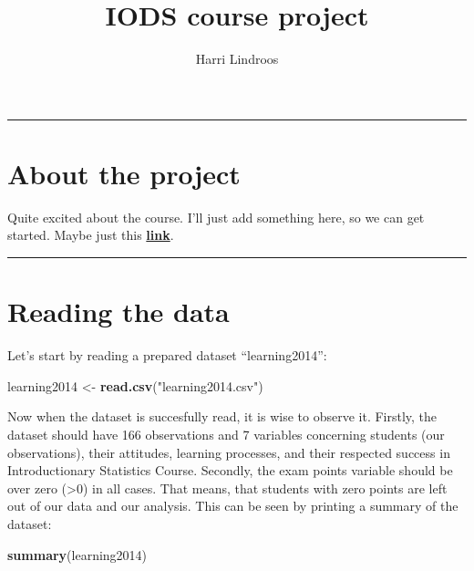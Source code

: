 \documentclass[]{article}
\title{IODS course project}
\author{Harri Lindroos}
\date{}
\newenvironment{Shaded}{\begin{snugshade}}{\end{snugshade}}
\newcommand{\KeywordTok}[1]{\textcolor[rgb]{0.13,0.29,0.53}{\textbf{#1}}}
\newcommand{\StringTok}[1]{\textcolor[rgb]{0.31,0.60,0.02}{#1}}
\newcommand{\NormalTok}[1]{#1}
\begin{document}
\maketitle

{
\setcounter{tocdepth}{2}
\tableofcontents
}
\begin{center}\rule{0.5\linewidth}{\linethickness}\end{center}

\section{About the project}\label{about-the-project}

Quite excited about the course. I'll just add something here, so we can
get started. Maybe just this
\href{https://github.com/harrlind/IODS-project}{\textbf{link}}.

\begin{center}\rule{0.5\linewidth}{\linethickness}\end{center}

\section{Reading the data}\label{reading-the-data}

Let's start by reading a prepared dataset ``learning2014'':

\begin{Shaded}
\begin{Highlighting}[]
\NormalTok{learning2014 <-}\StringTok{ }\KeywordTok{read.csv}\NormalTok{(}\StringTok{"learning2014.csv"}\NormalTok{)}
\end{Highlighting}
\end{Shaded}

Now when the dataset is succesfully read, it is wise to observe it.
Firstly, the dataset should have 166 observations and 7 variables
concerning students (our observations), their attitudes, learning
processes, and their respected success in Introductionary Statistics
Course. Secondly, the exam points variable should be over zero
(\textgreater{}0) in all cases. That means, that students with zero
points are left out of our data and our analysis. This can be seen by
printing a summary of the dataset:

\begin{Shaded}
\begin{Highlighting}[]
\KeywordTok{summary}\NormalTok{(learning2014)}
\end{Highlighting}
\end{Shaded}
\end{document}
